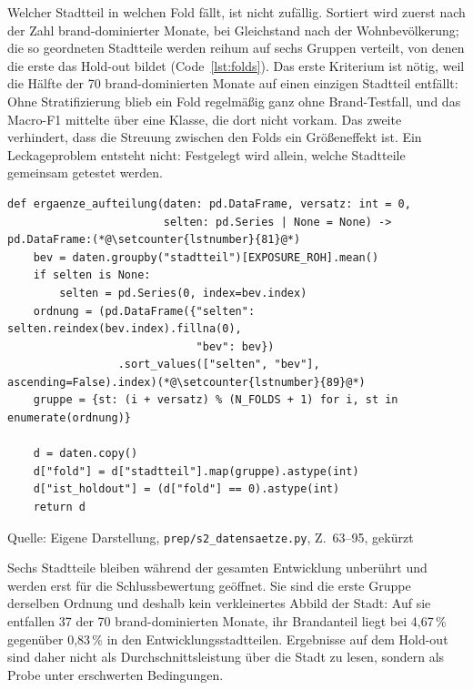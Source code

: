 \documentclass[12pt,a4paper]{article}
\newcommand{\tabquelle}[1][Eigene Darstellung]{%
  \par\setlength{\parskip}{0pt}\vspace{3pt}%
  {\setstretch{1}\fontsize{9pt}{11pt}\selectfont\raggedright Quelle: #1\par}%
}
\begin{document}
Welcher Stadtteil in welchen Fold fällt, ist nicht zufällig. Sortiert wird
zuerst nach der Zahl brand-dominierter Monate, bei Gleichstand nach der
Wohnbevölkerung; die so geordneten Stadtteile werden reihum auf sechs Gruppen
verteilt, von denen die erste das Hold-out bildet (Code~\ref{lst:folds}).
Das erste Kriterium ist nötig, weil die Hälfte der 70 brand-dominierten Monate
auf einen einzigen Stadtteil entfällt: Ohne Stratifizierung blieb ein Fold
regelmäßig ganz ohne Brand-Testfall, und das Macro-F1 mittelte über eine
Klasse, die dort nicht vorkam. Das zweite verhindert, dass die Streuung
zwischen den Folds ein Größeneffekt ist. Ein Leckageproblem entsteht nicht:
Festgelegt wird allein, welche Stadtteile gemeinsam getestet werden.
 
\begin{quellcode}[htbp]
\caption{Fold-Zuteilung mit doppelter Stratifizierung}
\label{lst:folds}\vspace{-3.5pt}
\begin{lstlisting}[style=pythonstil,firstnumber=63]
def ergaenze_aufteilung(daten: pd.DataFrame, versatz: int = 0,
                        selten: pd.Series | None = None) -> pd.DataFrame:(*@\setcounter{lstnumber}{81}@*)
    bev = daten.groupby("stadtteil")[EXPOSURE_ROH].mean()
    if selten is None:
        selten = pd.Series(0, index=bev.index)
    ordnung = (pd.DataFrame({"selten": selten.reindex(bev.index).fillna(0),
                             "bev": bev})
                 .sort_values(["selten", "bev"], ascending=False).index)(*@\setcounter{lstnumber}{89}@*)
    gruppe = {st: (i + versatz) % (N_FOLDS + 1) for i, st in enumerate(ordnung)}
 
    d = daten.copy()
    d["fold"] = d["stadtteil"].map(gruppe).astype(int)
    d["ist_holdout"] = (d["fold"] == 0).astype(int)
    return d
\end{lstlisting}
\tabquelle[Eigene Darstellung, \texttt{prep/s2\_datensaetze.py}, Z.~63--95, gekürzt]
\end{quellcode}
 
Sechs Stadtteile bleiben während der gesamten Entwicklung unberührt und werden
erst für die Schlussbewertung geöffnet. Sie sind die erste Gruppe derselben
Ordnung und deshalb kein verkleinertes Abbild der Stadt: Auf sie entfallen 37
der 70 brand-dominierten Monate, ihr Brandanteil liegt bei 4,67\,\% gegenüber
0,83\,\% in den Entwicklungsstadtteilen. Ergebnisse auf dem Hold-out sind daher
nicht als Durchschnittsleistung über die Stadt zu lesen, sondern als Probe
unter erschwerten Bedingungen.
 
\end{document}
